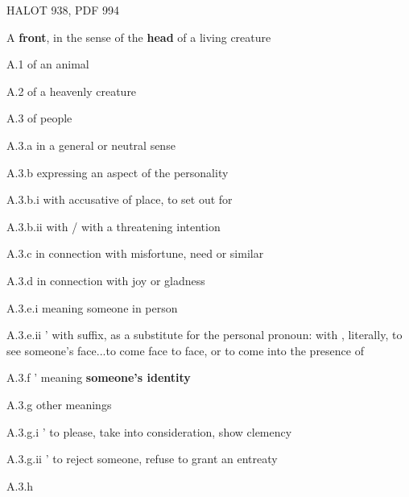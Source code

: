 				\begin{compactdesc}
				
					\item[HALOT 938, PDF 994] \phantom{.}%
						\begin{compactitem}
							\item[A] \textbf{front}, in the sense of the \textbf{head} of a living creature
							\item[A.1] of an animal
							\item[A.2] of a heavenly creature
							\item[A.3] of people
							\item[A.3.a] in a general or neutral sense
							\item[A.3.b] expressing an aspect of the personality
							\item[A.3.b.i] with accusative of place, to set out for
							\item[A.3.b.ii] with / with a threatening intention
							\item[A.3.c] in connection with misfortune, need or similar
							\item[A.3.d] in connection with joy or gladness
							\item[A.3.e.i]  meaning someone in person
							\item[A.3.e.ii] ' with suffix, as a substitute for the personal pronoun: with , literally, to see someone's face...to come face to face, or to come into the presence of 
							\item[A.3.f] ' meaning \textbf{someone's identity}
							\item[A.3.g] other meanings
							\item[A.3.g.i] ' to please, take into consideration, show clemency
							\item[A.3.g.ii] ' to reject someone, refuse to grant an entreaty
							\item[A.3.h] 
						\end{compactitem}
						
						
						

\end{compactdesc}
